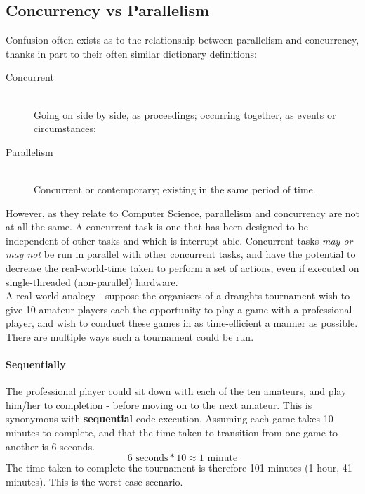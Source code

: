 \subsection{Concurrency vs Parallelism}
\label{sub:concurrencyparallelism}


Confusion often exists as to the relationship between parallelism and
concurrency, thanks in part to their often similar dictionary definitions:

\begin{description}
  \item[Concurrent] \hfill \\ Going on side by side, as proceedings; occurring
  together, as events or circumstances;\cite{oed}
  \item[Parallelism] \hfill \\ Concurrent or contemporary; existing in the same
  period of time.\cite{oed}
\end{description}

However, as they relate to Computer Science, parallelism and concurrency are not
at all the same. A concurrent task is one that has been designed to be
independent of other tasks and which is interrupt-able. Concurrent tasks
\emph{may or may not} be run in parallel with other concurrent tasks, and have
the potential to decrease the real-world-time taken to perform a set of actions,
even if executed on single-threaded (non-parallel) hardware. \\

A real-world analogy - suppose the organisers of a draughts tournament wish to
give 10 amateur players each the opportunity to play a game with a professional
player, and wish to conduct these games in as time-efficient a manner as
possible. There are multiple ways such a tournament could be run. \\

\paragraph{Sequentially}

The professional player could sit down with each of the ten amateurs, and play
him/her to completion - before moving on to the next amateur. This is synonymous
with \textbf{sequential} code execution. Assuming each game takes 10 minutes to
complete, and that the time taken to transition from one game to another is 6
seconds. $$6 \text{ seconds} * 10 \approx 1 \text{ minute}$$
The time taken to complete the tournament is therefore 101 minutes (1 hour, 41
minutes). This is the worst case scenario. \\

